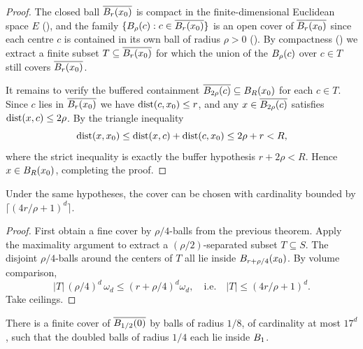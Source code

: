 \begin{proof}
\leanok

The closed ball $\overline{B_{r}(x_0)}$ is compact in the finite-dimensional
Euclidean space $E$ (), and the family
$\{B_{\rho}(c): c \in \overline{B_{r}(x_0)}\}$ is an open cover of
$\overline{B_{r}(x_0)}$ since each centre $c$ is contained in its own ball
of radius $\rho > 0$ (). By compactness
() we extract a finite subset
$T \subseteq \overline{B_{r}(x_0)}$ for which the union of the
$B_{\rho}(c)$ over $c \in T$ still covers $\overline{B_{r}(x_0)}$.

It remains to verify the buffered containment
$\overline{B_{2\rho}(c)} \subseteq B_{R}(x_0)$ for each $c \in T$. Since
$c$ lies in $\overline{B_{r}(x_0)}$ we have $\operatorname{dist}(c,x_0) \le r$, and any
$x \in \overline{B_{2\rho}(c)}$ satisfies $\operatorname{dist}(x,c) \le 2\rho$. By the
triangle inequality
\begin{equation*}
  \operatorname{dist}(x, x_0) \le \operatorname{dist}(x, c) + \operatorname{dist}(c, x_0) \le 2\rho + r < R,
\end{equation*}
where the strict inequality is exactly the buffer hypothesis $r + 2\rho < R$.
Hence $x \in B_{R}(x_0)$, completing the proof.
\end{proof}

\begin{theorem}
\label{thm:finite-cover-card}
\leanok
Under the same hypotheses, the cover can be chosen with cardinality bounded
by $\lceil(4r/\rho + 1)^d\rceil$.
\end{theorem}

\begin{proof}
\leanok
{}

First obtain a fine cover by $\rho/4$-balls from the previous theorem. Apply
the maximality argument
 to extract a $(\rho/2)$-separated
subset $T \subseteq S$. The disjoint $\rho/4$-balls around the centers of $T$
all lie inside $B_{r + \rho/4}(x_0)$. By volume comparison,
\begin{equation*}
|T|\,(\rho/4)^d\, \omega_d \le (r + \rho/4)^d \omega_d,
\quad\text{i.e.}\quad
|T| \le (4r/\rho + 1)^d.
\end{equation*}
Take ceilings.
\end{proof}

\begin{theorem}
\label{thm:exists_halfBall_cover_by_eighth_balls}
\leanok
There is a finite cover of $\overline{B_{1/2}(0)}$ by balls of radius
$1/8$, of cardinality at most $17^d$, such that the doubled balls of radius
$1/4$ each lie inside $B_{1}$.
\end{theorem}

